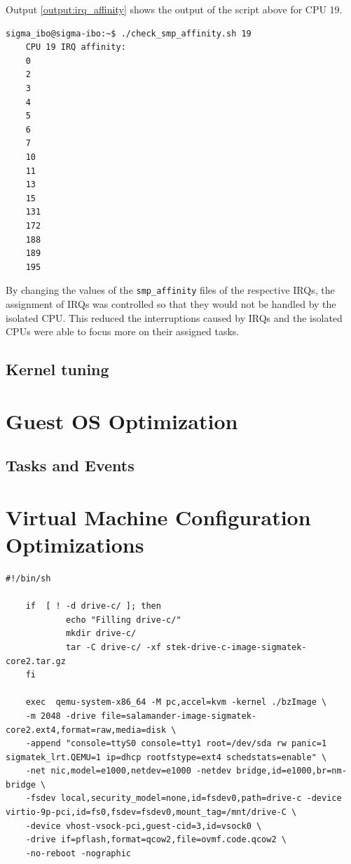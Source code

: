 \documentclass[MMR,Master,english]{twbook}
\begin{document}
Output \ref{output:irq_affinity} shows the output of the script above for CPU 19.

\vspace{1em}
\begin{minipage}{0.95\columnwidth}
\begin{lstlisting}[name={Output of smp_affinity for CPU 19},label={output:irq_affinity}, breaklines=true]
	sigma_ibo@sigma-ibo:~$ ./check_smp_affinity.sh 19
	CPU 19 IRQ affinity:
	0
	2
	3
	4
	5
	6
	7
	10
	11
	13
	15
	131
	172
	188
	189
	195
\end{lstlisting}
\end{minipage}


\noindent By changing the values of the \texttt{smp\_affinity} files of the respective IRQs, the assignment of IRQs was controlled so that they would not be handled by the isolated CPU. This reduced the interruptions caused by IRQs and the isolated CPUs were able to focus more on their assigned tasks.
\clearpage
\subsection{Kernel tuning}
\clearpage
\section{Guest OS Optimization}
\clearpage
\subsection{Tasks and Events}
\clearpage

\section{Virtual Machine Configuration Optimizations}

\vspace{1em}
\begin{minipage}{\linewidth}
	\begin{lstlisting}[name={QEMU script for starting Salamander 4 virtualisation},label={script:qemu_configuration_optimizations}]
    #!/bin/sh

    if  [ ! -d drive-c/ ]; then
            echo "Filling drive-c/"
            mkdir drive-c/
            tar -C drive-c/ -xf stek-drive-c-image-sigmatek-core2.tar.gz
    fi
    
    exec  qemu-system-x86_64 -M pc,accel=kvm -kernel ./bzImage \
    -m 2048 -drive file=salamander-image-sigmatek-core2.ext4,format=raw,media=disk \
    -append "console=ttyS0 console=tty1 root=/dev/sda rw panic=1 sigmatek_lrt.QEMU=1 ip=dhcp rootfstype=ext4 schedstats=enable" \
    -net nic,model=e1000,netdev=e1000 -netdev bridge,id=e1000,br=nm-bridge \
    -fsdev local,security_model=none,id=fsdev0,path=drive-c -device virtio-9p-pci,id=fs0,fsdev=fsdev0,mount_tag=/mnt/drive-C \
    -device vhost-vsock-pci,guest-cid=3,id=vsock0 \
    -drive if=pflash,format=qcow2,file=ovmf.code.qcow2 \
    -no-reboot -nographic
\end{lstlisting}
\end{minipage}
\clearpage
\end{document}
